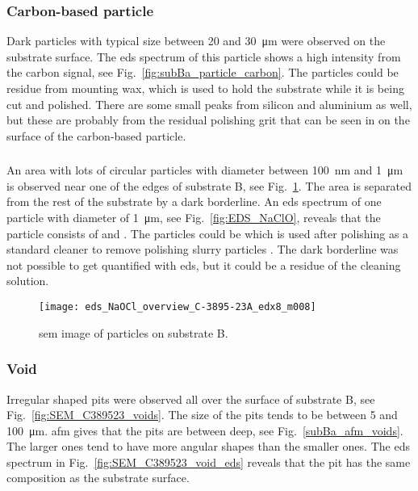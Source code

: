 \subsubsection{Carbon-based particle}
Dark particles with typical size between \SI{20}{} and \SI{30}{\micro\metre} were observed on the substrate surface. The \ac{eds} spectrum of this particle shows a high intensity from the carbon signal, see Fig.~\ref{fig:subBa_particle_carbon}. The particles could be residue from mounting wax, which is used to hold the substrate while it is being cut and polished. There are some small peaks from silicon and aluminium as well, but these are probably from the residual polishing grit that can be seen in on the surface of the carbon-based particle.

\subsubsection{}
An area with lots of circular particles with diameter between \SI{100}{\nano\metre} and \SI{1}{\micro\metre} is observed near one of the edges of substrate B, see Fig.~\ref{fig:eds_NaOCl_overview}. The area is separated from the rest of the substrate by a dark borderline. An \ac{eds} spectrum of one particle with diameter of \SI{1}{\micro\metre}, see Fig.~\ref{fig:EDS_NaClO}, reveals that the particle consists of  and . The particles could be  which is used after polishing as a standard cleaner to remove polishing slurry particles \citep{benson2015as-received}. The dark borderline was not possible to get quantified with \ac{eds}, but it could be a residue of the cleaning solution.

\begin{figure}
    \centering
    \texttt{[image: eds\_NaOCl\_overview\_C-3895-23A\_edx8\_m008]}
    \caption[\Ac{sem} image of  particles on substrate B.]{\Ac{sem} image of  particles on substrate B.}
    \label{fig:eds_NaOCl_overview}
\end{figure}


\subsubsection{Void}
Irregular shaped pits were observed all over the surface of substrate B, see Fig.~\ref{fig:SEM_C389523_voids}. The size of the pits tends to be between \SI{5}{} and \SI{100}{\micro\metre}. \Ac{afm} gives that the pits are between  deep, see Fig.~\ref{subBa_afm_voids}. The larger ones tend to have more angular shapes than the smaller ones. The \ac{eds} spectrum in Fig.~\ref{fig:SEM_C389523_void_eds} reveals that the pit has the same composition as the substrate surface.


